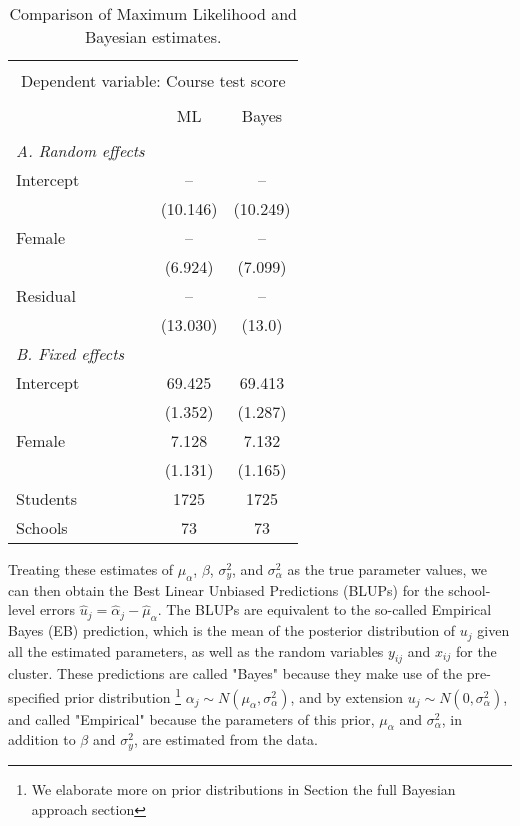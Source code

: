 \begin{table}[H]
	\centering
	\caption{{\small Comparison of Maximum Likelihood and Bayesian estimates.}}
	\label{}
	
	\smallskip
	\begin{tabular}{l*{2}{c}}
		\toprule \\[-1.0em]
		\multicolumn{3}{c}{Dependent variable: Course test score}\\ \\[-1.0em]
		&ML &Bayes\\
		\midrule \\[-1.0em]
		\emph{A. Random effects}\\
		Intercept & -- & --\\
		& (10.146) & (10.249)\\
		Female & -- & --\\
		& (6.924) & (7.099)\\
		Residual & -- & --\\
		& (13.030) & (13.0)\\
		\emph{B. Fixed effects} \\
		Intercept & 69.425 & 69.413\\
		& (1.352) & (1.287)\\
		Female & 7.128 & 7.132\\
		& (1.131) & (1.165)\\
		\hline
		Students&1725&1725\\
		Schools&73&73\\
		\bottomrule
		
	\end{tabular}
	\label{tab:results}
\end{table}
Treating these estimates of $\mu_\alpha$, $\beta$, $\sigma^2_{y}$, and $\sigma^2_{\alpha}$ as the true parameter values, we can then obtain the Best Linear Unbiased Predictions (BLUPs) for the school-level errors $\hat{u}_j = \hat{\alpha}_{j} - \hat{\mu}_{\alpha}$. The BLUPs are equivalent to the so-called Empirical Bayes (EB) prediction, which is the mean of the posterior distribution of $u_{j}$ given all the estimated parameters, as well as the random variables $y_{ij}$ and $x_{ij}$ for the cluster.  These predictions are called "Bayes" because they make use of the pre-specified prior distribution \footnote{We elaborate more on prior distributions in Section the full Bayesian approach section} $\alpha_j \sim N(\mu_\alpha, \sigma^2_\alpha)$, and by extension $u_j \sim N(0, \sigma^2_\alpha)$, and called "Empirical" because the parameters of this prior, $\mu_\alpha$ and $\sigma^2_{\alpha}$, in addition to $\beta$ and $\sigma^2_{y}$, are estimated from the data.

